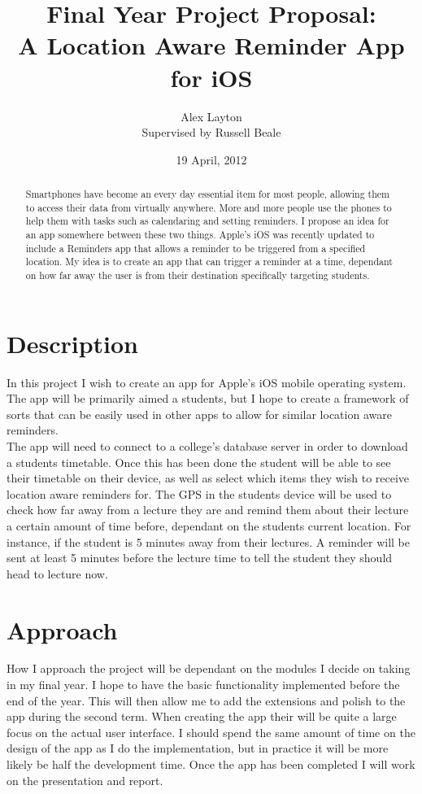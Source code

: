 \documentclass[12pt]{article}
\title{{\small Final Year Project Proposal:} \\ A Location Aware Reminder App for iOS}
\author{Alex Layton \\ {\small Supervised by Russell Beale}}
\date{19 April, 2012}
\begin{document}
\maketitle

\begin{abstract}
	Smartphones have become an every day essential item for most people, allowing them to access their data from virtually anywhere. More and more people use the phones to help them with tasks such as calendaring and setting reminders. I propose an idea for an app somewhere between these two things. Apple's iOS was recently updated to include a Reminders app that allows a reminder to be triggered from a specified location. My idea is to create an app that can trigger a reminder at a time, dependant on how far away the user is from their destination specifically targeting students.   
\end{abstract}

\section*{Description}
	In this project I wish to create an app for Apple's iOS mobile operating system. The app will be primarily aimed a students, but I hope to create a framework of sorts that can be easily used in other apps to allow for similar location aware reminders.\\
	The app will need to connect to a college's database server in order to download a students timetable. Once this has been done the student will be able to see their timetable on their device, as well as select which items they wish to receive location aware reminders for. The GPS in the students device will be used to check how far away from a lecture they are and remind them about their lecture a certain amount of time before, dependant on the students current location. For instance, if the student is 5 minutes away from their lectures. A reminder will be sent at least 5 minutes before the lecture time to tell the student they should head to lecture now.

\section*{Approach}
	How I approach the project will be dependant on the modules I decide on taking in my final year. I hope to have the basic functionality implemented before the end of the year. This will then allow me to add the extensions and polish to the app during the second term. When creating the app their will be quite a large focus on the actual user interface. I should spend the same amount of time on the design of the app as I do the implementation, but in practice it will be more likely be half the development time. Once the app has been completed I will work on the presentation and report.
\end{document}

